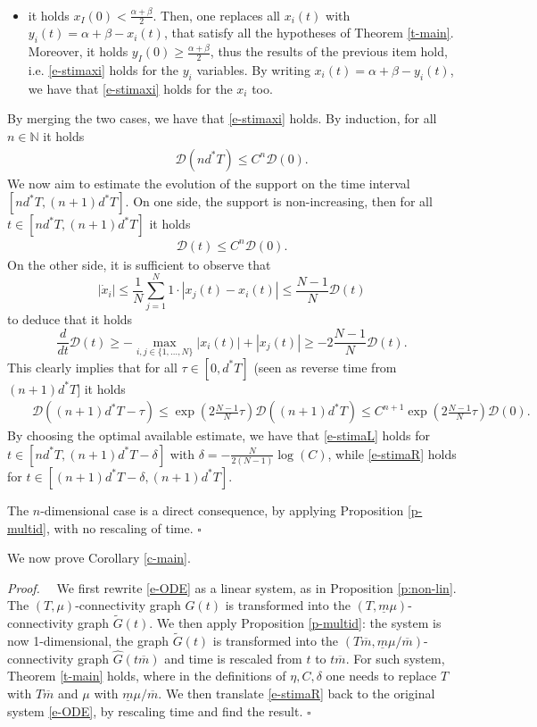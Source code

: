 \documentclass[journal]{article}
\newenvironment{proof}{{\it Proof.}~~}{\hfill$\square$}
\newcommand{\diam}[1]{\mathcal{D}(#1)}
\begin{document}
\begin{proof}
\begin{itemize}
\item it holds $x_I(0)<\frac{\alpha+\beta}2$. Then, one replaces all $x_i(t)$ with $y_i(t)=\alpha+\beta-x_i(t)$, that satisfy all the hypotheses of Theorem \ref{t-main}. Moreover, it holds $y_I(0)\geq \frac{\alpha+\beta}2$, thus the results of the previous item hold, i.e. \eqref{e-stimaxi} holds for the $y_i$ variables. By writing $x_i(t)=\alpha+\beta-y_i(t)$, we have that \eqref{e-stimaxi} holds for the $x_i$ too.
\end{itemize}
By merging the two cases, we have that \eqref{e-stimaxi} holds. By induction, for all $n\in\mathbb{N}$ it holds
\begin{eqnarray*}
&&\diam{nd^*T}\leq C^n \diam{0}.
\end{eqnarray*}
We now aim to estimate the evolution of the support on the time interval $[nd^*T,(n+1)d^*T]$. On one side, the support is non-increasing, then for all $t\in [nd^*T,(n+1)d^*T]$ it holds
\begin{eqnarray}\diam{t}\leq  C^n \diam{0}.\label{e-stimaL}
\end{eqnarray}
 On the other side, it is sufficient to observe that $$|\dot x_i|\leq\frac1N \sum_{j=1}^N 1\cdot |x_j(t)-x_i(t)|\leq \frac{N-1}N \diam{t}$$
to deduce that it holds $$\frac{d}{dt}\diam{t}\geq -\max_{i,j\in\{1,\ldots,N\}} |x_i(t)|+|x_j(t)|\geq -2\frac{N-1}N \diam{t}.$$
This clearly implies that for all $\tau\in[0,d^*T]$ (seen as reverse time from $(n+1)d^*T]$ it holds
\begin{eqnarray}&&\diam{(n+1)d^*T-\tau}\leq \exp\left(2\frac{N-1}N\tau\right) \diam{ (n+1)d^*T} \leq C^{n+1} \exp\left(2\frac{N-1}N\tau\right) \diam{0}.\label{e-stimaR}
\end{eqnarray}
By choosing the optimal available estimate, we have that \eqref{e-stimaL} holds for $t\in[nd^*T,(n+1)d^*T-\delta]$ with $\delta=-\frac{N}{2(N-1)}\log(C)$, while \eqref{e-stimaR} holds for $t\in [(n+1)d^*T-\delta,(n+1)d^*T]$.


The $n$-dimensional case is a direct consequence, by applying Proposition \ref{p-multid}, with no rescaling of time.
\end{proof}

We now prove Corollary \ref{c-main}.

\begin{proof} We first rewrite \eqref{e-ODE} as a linear system, as in Proposition \ref{p:non-lin}. The $(T,\mu)$-connectivity graph $G(t)$ is transformed into the $(T,\underline{m}\mu)$-connectivity graph $\tilde G(t)$. We then apply Proposition \ref{p-multid}: the system is now 1-dimensional, the graph $\tilde G(t)$ is transformed into the $(T\overline{m},\underline{m}\mu/\overline{m})$-connectivity graph $\hat G(t\overline{m})$ and time is rescaled from $t$ to $t\overline{m}$. For such system, Theorem \ref{t-main} holds, where in the definitions of $\eta,C,\delta$ one needs to replace $T$ with $T\overline{m}$ and $\mu$ with $\underline{m}\mu/\overline{m}$. We then translate \eqref{e-stimaR} back to the original system \eqref{e-ODE}, by rescaling time and find the result.
\end{proof}
\end{document}
